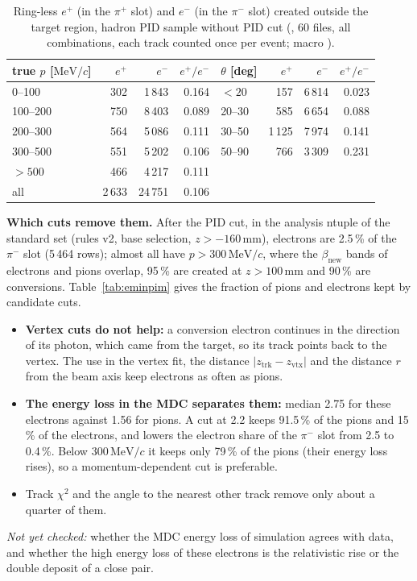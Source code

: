 \documentclass[11pt,a4paper]{article}
\newcommand{\pip}{\ensuremath{\pi^{+}}\xspace}
\newcommand{\pim}{\ensuremath{\pi^{-}}\xspace}
\newcommand{\betanew}{\ensuremath{\beta_{\mathrm{new}}}\xspace}
\newcommand{\MeVc}{\ensuremath{\mathrm{MeV}/c}\xspace}
\newcommand{\code}[1]{\texttt{\detokenize{#1}}}
\begin{document}
\begin{table}[H]
\centering
\caption{Ring-less $e^+$ (in the \pip slot) and $e^-$ (in the \pim slot) created outside the target
region, hadron PID sample without PID cut (\code{HH_elossfix}, 60 files, all combinations, each
track counted once per event; macro \code{macros/asym.C}).}
\label{tab:asym}
\small
\begin{tabular}{@{}l r r r@{\qquad}l r r r@{}}
\toprule
true $p$ [\MeVc] & $e^+$ & $e^-$ & $e^+/e^-$ & $\theta$ [deg] & $e^+$ & $e^-$ & $e^+/e^-$ \\
\midrule
0--100    & 302 & 1\,843 & 0.164 & $<20$  & 157 & 6\,814 & 0.023 \\
100--200  & 750 & 8\,403 & 0.089 & 20--30 & 585 & 6\,654 & 0.088 \\
200--300  & 564 & 5\,086 & 0.111 & 30--50 & 1\,125 & 7\,974 & 0.141 \\
300--500  & 551 & 5\,202 & 0.106 & 50--90 & 766 & 3\,309 & 0.231 \\
$>500$    & 466 & 4\,217 & 0.111 & & & & \\
\midrule
all       & 2\,633 & 24\,751 & 0.106 & & & & \\
\bottomrule
\end{tabular}
\end{table}

\textbf{Which cuts remove them.} After the PID cut, in the analysis ntuple of the standard set
(rules v2, base selection, $z>-160$\,mm), electrons are 2.5\,\% of the \pim slot (5\,464 rows); almost
all have $p>300$\,\MeVc, where the $\betanew$ bands of electrons and pions overlap, 95\,\% are
created at $z>100$\,mm and 90\,\% are conversions. Table~\ref{tab:eminpim} gives the fraction of
pions and electrons kept by candidate cuts.
\begin{itemize}
\item \textbf{Vertex cuts do not help:} a conversion electron continues in the direction of its
      photon, which came from the target, so its track points back to the vertex. The use in the
      vertex fit, the distance $|z_{\mathrm{trk}}-z_{\mathrm{vtx}}|$ and the distance $r$ from the beam
      axis keep electrons as often as pions.
\item \textbf{The energy loss in the MDC separates them:} median 2.75 for these electrons against 1.56
      for pions. A cut at 2.2 keeps 91.5\,\% of the pions and 15\,\% of the electrons, and lowers the
      electron share of the \pim slot from 2.5 to 0.4\,\%. Below 300\,\MeVc it keeps only 79\,\% of the
      pions (their energy loss rises), so a momentum-dependent cut is preferable.
\item Track $\chi^2$ and the angle to the nearest other track remove only about a quarter of them.
\end{itemize}
\emph{Not yet checked:} whether the MDC energy loss of simulation agrees with data, and whether the
high energy loss of these electrons is the relativistic rise or the double deposit of a close pair.
\end{document}
